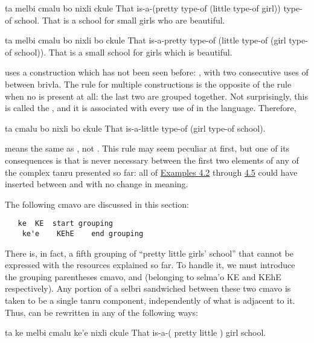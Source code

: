 \begin{example}
ta melbi cmalu bo nixli\n
\T	ckule\n
That is-a-(pretty type-of (little type-of girl))\n
\T	type-of school.\n
That is a school for small girls who are beautiful.
\end{example}

\begin{example}
ta melbi cmalu bo\n
\T	nixli bo ckule\n
That is-a-pretty type-of (little type-of\n
\T	(girl type-of school)).\n
That is a small school for girls which is beautiful.
\end{example}

 uses a construction which has
    not been seen before: , with two
    consecutive uses of  between brivla. The rule for
    multiple  constructions is the opposite of the rule when
    no  is present at all: the last two are grouped together.
    Not surprisingly, this is called the ,
    and it is associated with every use of  in the language.
    Therefore,
\begin{example}
ta cmalu bo nixli bo ckule\n
That is-a-little type-of (girl type-of school).
\end{example}

{\noindent}means the same as , not . This rule may seem peculiar at
    first, but one of its consequences is that  is never
    necessary between the first two elements of any of the complex
    tanru presented so far: all of \hyperref[html:e4d2]{Examples
    4.2} through \hyperref[html:e4d5]{4.5} could have 
    inserted between  and  with no change in
    meaning.



The following cmavo are discussed in this section:
\begin{verbatim}
   ke  KE  start grouping
    ke'e    KEhE    end grouping
\end{verbatim}
    There is, in fact, a fifth grouping of ``pretty little girls'
    school'' that cannot be expressed with the resources explained
    so far. To handle it, we must introduce the grouping
    parentheses cmavo,  and  (belonging to selma'o KE
    and KEhE respectively). Any portion of a selbri sandwiched
    between these two cmavo is taken to be a single tanru
    component, independently of what is adjacent to it. Thus,  can be rewritten in any of the
    following ways:
\begin{example}
ta ke melbi cmalu ke'e nixli ckule\n
That is-a-( pretty little ) girl school.
\end{example}

